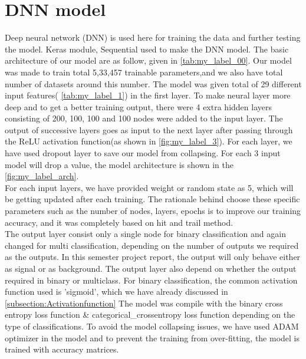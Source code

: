 \section{DNN model}
Deep neural network (DNN) is used here for training the data and further testing the model. Keras module, Sequential used to make the DNN model. The basic architecture of our model are as follow, given in \autoref{tab:my_label_00}. Our model was made to train total 5,33,457 trainable parameters,and we also have total number of datasets around this number. The model was given total of 29 different input features( \autoref{tab:my_label_1}) in the first layer. To make neural layer more deep and to get a better training output, there were 4 extra hidden layers consisting of 200, 100, 100 and 100 nodes were added to the input layer. The output of successive layers goes as input to the next layer after passing through the  ReLU activation function(as shown in \autoref{fig:my_label_3}). For each layer, we have used dropout layer to save our model from collapsing.  For each 3 input model will drop a value, the model architecture is shown in the \autoref{fig:my_label_arch}.\\

For each input layers, we have provided weight or random state as 5, which will be getting updated after each training. The rationale behind choose these specific parameters such as the number of nodes, layers, epochs is to improve our training accuracy, and it was completely based on hit and trail method. \\

The output layer consist  only a single node for binary classification and again changed for multi classification, depending on the number of outputs we required as the outputs. In this semester project report, the output will only behave either as signal or as background. The  output layer also depend on whether the output required in binary or multiclass. For binary classification, the common activation function used is 'sigmoid', which we have already discussed in \autoref{subsection:Activationfunction} 
The model was compile with the binary cross entropy loss function \& categorical\_crossentropy loss function depending on the type of classifications. To avoid the model collapsing issues, we have used ADAM optimizer in the model and to prevent the training from over-fitting, the model is trained with accuracy matrices.\\

